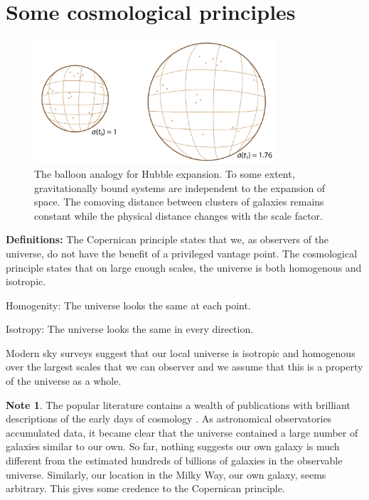 \documentclass[a4paper,12pt]{article}
\theoremstyle{remark}
\renewcommand{\=}[1]{\stackrel{#1}{=}} %
\theoremstyle{plain}
\theoremstyle{definition}
\newtheorem*{definitionT}{Note}%
\newenvironment{note}{
\begin{dBox}
\begin{definitionT}}
{\end{definitionT}
\end{dBox}}
\begin{document}
\section{Some cosmological principles} 
\begin{figure}[t]
\begin{center}
    \includegraphics*[angle=0,width=0.8\textwidth]{img/hubble.png}
    \caption[Insert text]{The balloon analogy for Hubble expansion. To some extent, gravitationally bound systems are independent to the expansion of space. The comoving distance between clusters of galaxies remains constant while the physical distance changes with the scale factor.}
\label{fig:hubble_expansion}
\end{center}
\end{figure}
 
\textbf{Definitions:} The Copernican principle states that we, as observers of the universe, do not have the benefit of a privileged vantage point. The cosmological principle states that on large enough scales, the universe is both homogenous and isotropic. 
 
Homogenity: The universe looks the same at each point.

Isotropy: The universe looks the same in every direction.

Modern sky surveys suggest that our local universe is isotropic and homogenous over the largest scales that we can observer and we assume that this is a property of the universe as a whole.

 \begin{note}
 The popular literature contains a wealth of publications with brilliant descriptions of the early days of cosmology \cite{Lemaitre2005, Guth1997, Singh2005, Weinberg1993}. As astronomical observatories accumulated data, it became clear that the universe contained a large number of galaxies similar to our own. So far, nothing suggests our own galaxy is much different from the estimated hundreds of billions of galaxies in the observable universe. Similarly, our location in the Milky Way, our own galaxy, seems arbitrary. This gives some credence to the Copernican principle.
 \end{note}
\end{document}
